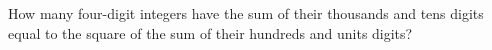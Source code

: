How many four-digit integers have the sum of their thousands and tens digits equal to the square of the sum of their hundreds and units digits?
